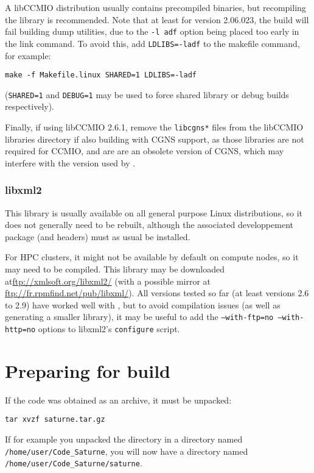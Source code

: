 \documentclass[a4paper,10pt,twoside]{csshortdoc}
\begin{document}
A libCCMIO distribution usually contains precompiled
binaries, but recompiling the library is recommended.
Note that at least for version 2.06.023, the build will fail
building dump utilities, due to the \texttt{-l adf} option
being placed too early in the link command. To avoid this,
add \texttt{LDLIBS=-ladf} to the makefile command, for example:

\texttt{make -f Makefile.linux SHARED=1 LDLIBS=-ladf}

(\texttt{SHARED=1} and \texttt{DEBUG=1} may be used to force
shared library or debug builds respectively).

Finally, if using libCCMIO 2.6.1, remove the \texttt{libcgns*}
files from the libCCMIO libraries directory if also building
\CS with CGNS support, as those libraries are not required
for CCMIO, and are are an obsolete version of CGNS, which
may interfere with the version used by \CS.

\subsubsection{libxml2\label{sec:ext:libxml2}}

This library is usually available on all general purpose Linux
distributions, so it does not generally need to be rebuilt,
although the associated developpement package (and headers) must
as usual be installed.

For HPC clusters, it might not be available by default on compute nodes,
so it may need to be compiled. This library may be downloaded
at\url{ftp://xmlsoft.org/libxml2/} (with a possible mirror at
\url{ftp://fr.rpmfind.net/pub/libxml/}). All versions tested so far
(at least versions 2.6 to 2.9) have worked well with \CS, but to avoid
compilation issues (as well as generating a smaller library), it
may be useful to add the \texttt{--with-ftp=no --with-http=no} options
to libxml2's \texttt{configure} script.

\section{Preparing for build\label{sec:prepare}}

If the code was obtained as an archive, it must be unpacked:

\texttt{tar xvzf saturne.tar.gz}

If for example you unpacked the directory in a directory
named \texttt{/home/user/Code\_Saturne}, you will now
have a directory named \texttt{/home/user/Code\_Saturne/saturne}.
\end{document}
